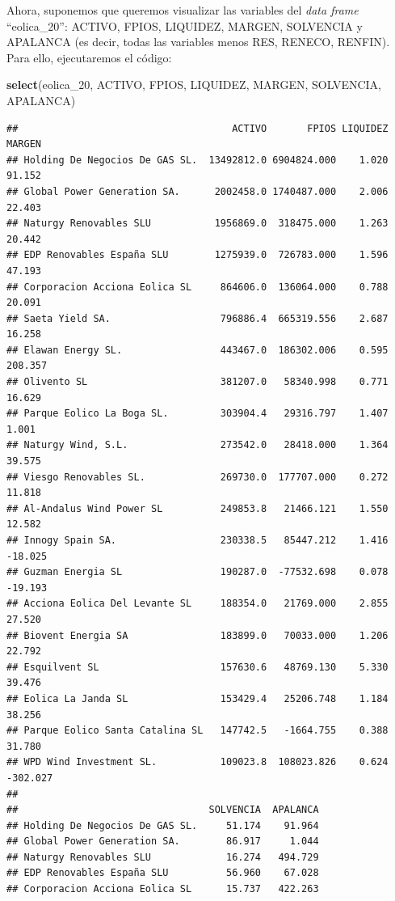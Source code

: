\documentclass[
]{book}
\newenvironment{Shaded}{\begin{snugshade}}{\end{snugshade}}
\newcommand{\FunctionTok}[1]{\textcolor[rgb]{0.13,0.29,0.53}{\textbf{#1}}}
\newcommand{\NormalTok}[1]{#1}
\begin{document}
Ahora, suponemos que queremos visualizar las variables del \emph{data frame} ``eolica\_20'': ACTIVO, FPIOS, LIQUIDEZ, MARGEN, SOLVENCIA y APALANCA (es decir, todas las variables menos RES, RENECO, RENFIN). Para ello, ejecutaremos el código:

\begin{Shaded}
\begin{Highlighting}[]
\FunctionTok{select}\NormalTok{(eolica\_20, ACTIVO, FPIOS, LIQUIDEZ, MARGEN, SOLVENCIA, APALANCA)}
\end{Highlighting}
\end{Shaded}

\begin{verbatim}
##                                     ACTIVO       FPIOS LIQUIDEZ   MARGEN
## Holding De Negocios De GAS SL.  13492812.0 6904824.000    1.020   91.152
## Global Power Generation SA.      2002458.0 1740487.000    2.006   22.403
## Naturgy Renovables SLU           1956869.0  318475.000    1.263   20.442
## EDP Renovables España SLU        1275939.0  726783.000    1.596   47.193
## Corporacion Acciona Eolica SL     864606.0  136064.000    0.788   20.091
## Saeta Yield SA.                   796886.4  665319.556    2.687   16.258
## Elawan Energy SL.                 443467.0  186302.006    0.595  208.357
## Olivento SL                       381207.0   58340.998    0.771   16.629
## Parque Eolico La Boga SL.         303904.4   29316.797    1.407    1.001
## Naturgy Wind, S.L.                273542.0   28418.000    1.364   39.575
## Viesgo Renovables SL.             269730.0  177707.000    0.272   11.818
## Al-Andalus Wind Power SL          249853.8   21466.121    1.550   12.582
## Innogy Spain SA.                  230338.5   85447.212    1.416  -18.025
## Guzman Energia SL                 190287.0  -77532.698    0.078  -19.193
## Acciona Eolica Del Levante SL     188354.0   21769.000    2.855   27.520
## Biovent Energia SA                183899.0   70033.000    1.206   22.792
## Esquilvent SL                     157630.6   48769.130    5.330   39.476
## Eolica La Janda SL                153429.4   25206.748    1.184   38.256
## Parque Eolico Santa Catalina SL   147742.5   -1664.755    0.388   31.780
## WPD Wind Investment SL.           109023.8  108023.826    0.624 -302.027
## 
##                                 SOLVENCIA  APALANCA
## Holding De Negocios De GAS SL.     51.174    91.964
## Global Power Generation SA.        86.917     1.044
## Naturgy Renovables SLU             16.274   494.729
## EDP Renovables España SLU          56.960    67.028
## Corporacion Acciona Eolica SL      15.737   422.263

\end{verbatim}
\end{document}
